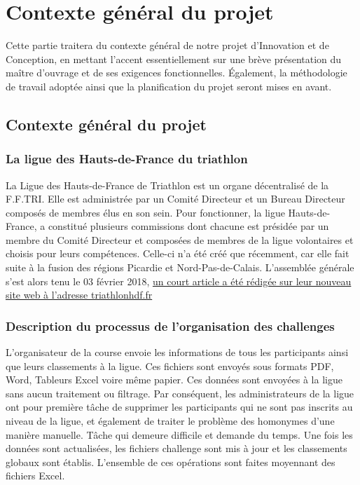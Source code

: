 	\chapter{Contexte général du projet}
	
	Cette partie traitera du contexte général de notre projet d’Innovation et de Conception, en mettant l’accent essentiellement sur une brève présentation du maître d'ouvrage et de ses exigences fonctionnelles. Également, la méthodologie de travail adoptée ainsi que la planification du projet seront mises en avant.  
	\newpage
	\section {Contexte général du projet}
	\subsection{La ligue des Hauts-de-France du triathlon }
	
	La Ligue des Hauts-de-France de Triathlon est un organe décentralisé de la F.F.TRI. Elle est administrée par un Comité Directeur et un Bureau Directeur composés de membres élus en son sein. 
	Pour fonctionner, la ligue Hauts-de-France, a constitué plusieurs commissions dont chacune est présidée par un membre du Comité Directeur et composées de membres de la ligue volontaires et choisis pour leurs compétences.
	Celle-ci n'a été créé que récemment, car elle fait suite à la fusion des régions Picardie et Nord-Pas-de-Calais.
	L'assemblée générale s'est alors tenu le 03 février 2018, \href{http://triathlonhdf.fr/samedi-03-fevrier-2018-la-ligue-des-hauts-de-france-de-triathlon-est-creee/}{un court article a été rédigée sur leur nouveau site web à l'adresse triathlonhdf.fr} \cite{ref1}
	
	\subsection{Description du processus de l’organisation des challenges }
	L’organisateur de la course envoie les informations de tous les participants ainsi que leurs classements à la ligue. Ces fichiers sont envoyés sous formats PDF, Word, Tableurs Excel voire même papier.  Ces données sont envoyées à la ligue sans aucun traitement ou filtrage. Par conséquent, les administrateurs de la ligue ont pour première tâche de supprimer les participants qui ne sont pas inscrits au niveau de la ligue, et également de traiter le problème des homonymes d’une manière manuelle. Tâche qui demeure difficile et demande du temps.
	Une fois les données sont actualisées, les fichiers challenge sont mis à jour et les classements globaux sont établis. L’ensemble de ces opérations sont faites moyennant des fichiers Excel.
	
